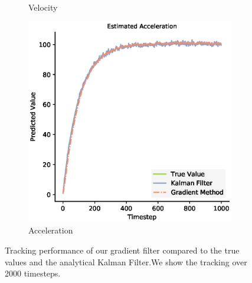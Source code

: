 \begin{figure}[H]
\begin{subfigure}{0.49\textwidth}
 \caption{Velocity}
 \end{subfigure}
 \begin{subfigure}{0.49\textwidth}\quad
 \centering
 \includegraphics[width=.95\linewidth]{chapter_3_figures/Estimated_Acceleration_NKF.eps}
 \caption{Acceleration}
 \end{subfigure}
 \caption{Tracking performance of our gradient filter compared to the true values and the analytical Kalman Filter.We show the tracking over 2000 timesteps.}
\end{figure}
